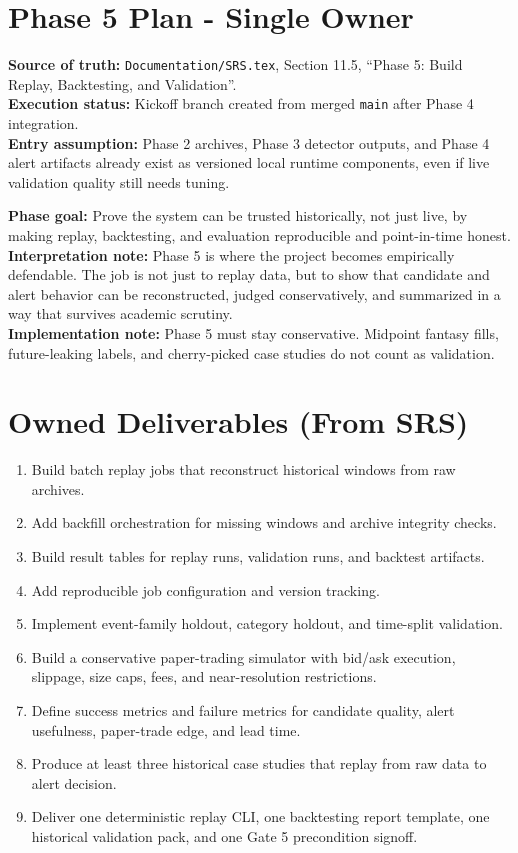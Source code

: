 \documentclass{article}
\begin{document}
\section*{Phase 5 Plan - Single Owner}

\textbf{Source of truth:} \texttt{Documentation/SRS.tex}, Section 11.5, ``Phase 5: Build Replay, Backtesting, and Validation''.\\
\textbf{Execution status:} Kickoff branch created from merged \texttt{main} after Phase 4 integration.\\
\textbf{Entry assumption:} Phase 2 archives, Phase 3 detector outputs, and Phase 4 alert artifacts already exist as versioned local runtime components, even if live validation quality still needs tuning.

\textbf{Phase goal:} Prove the system can be trusted historically, not just live, by making replay, backtesting, and evaluation reproducible and point-in-time honest.\\
\textbf{Interpretation note:} Phase 5 is where the project becomes empirically defendable. The job is not just to replay data, but to show that candidate and alert behavior can be reconstructed, judged conservatively, and summarized in a way that survives academic scrutiny.\\
\textbf{Implementation note:} Phase 5 must stay conservative. Midpoint fantasy fills, future-leaking labels, and cherry-picked case studies do not count as validation.

\section*{Owned Deliverables (From SRS)}
\begin{enumerate}
\item Build batch replay jobs that reconstruct historical windows from raw archives.
\item Add backfill orchestration for missing windows and archive integrity checks.
\item Build result tables for replay runs, validation runs, and backtest artifacts.
\item Add reproducible job configuration and version tracking.
\item Implement event-family holdout, category holdout, and time-split validation.
\item Build a conservative paper-trading simulator with bid/ask execution, slippage, size caps, fees, and near-resolution restrictions.
\item Define success metrics and failure metrics for candidate quality, alert usefulness, paper-trade edge, and lead time.
\item Produce at least three historical case studies that replay from raw data to alert decision.
\item Deliver one deterministic replay CLI, one backtesting report template, one historical validation pack, and one Gate 5 precondition signoff.
\end{enumerate}
\end{document}
